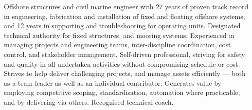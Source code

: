 \noindent Offshore structures and civil marine engineer with 27 years of proven track record in engineering, fabrication and installation of fixed and floating offshore systems, and 12 years in supporting and troubleshooting for operating units. Designated technical authority for fixed structures, and mooring systems. Experienced in managing projects and engineering teams, inter-discipline coordination, cost control, and stakeholder management. Self-driven professional, striving for safety and quality in all undertaken activities without compromising schedule or cost. Strives to help deliver challenging projects, and manage assets efficiently --- both as a team leader as well as an individual contributor. Generates value by employing competitive scoping, standardisation, automation where practicable, and by delivering via others. Recognised technical coach.